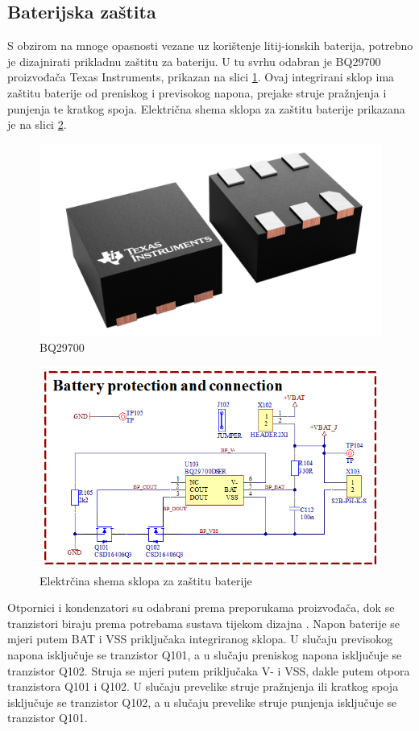 \subsection{Baterijska zaštita}
S obzirom na mnoge opasnosti vezane uz korištenje litij-ionskih baterija, potrebno je dizajnirati prikladnu zaštitu za bateriju. U tu svrhu odabran je BQ29700 proizvođača Texas Instruments, prikazan na slici \ref{slk:BQ29700}. Ovaj integrirani sklop ima zaštitu baterije od preniskog i previsokog napona, prejake struje pražnjenja i punjenja te kratkog spoja. Električna shema sklopa za zaštitu baterije prikazana je na slici \ref{slk:MB_BATPROT}.
\begin{figure}[hbt]
    \centering
    \includegraphics[width=6 cm]{Figures/BQ29700.png}
    \caption{BQ29700 \cite{tiweb:bq29700}}
    \label{slk:BQ29700}
\end{figure}
\begin{figure}[!hbt]
    \centering
    \includegraphics[width=10 cm]{Figures/MB_BATPROT.png}
    \caption{Elektrčina shema sklopa za zaštitu baterije}
    \label{slk:MB_BATPROT}
\end{figure}
Otpornici i kondenzatori su odabrani prema preporukama proizvođača, dok se tranzistori biraju prema potrebama sustava tijekom dizajna \cite{ti:bq29700}. Napon baterije se mjeri putem BAT i VSS priključaka integriranog sklopa. U slučaju previsokog napona isključuje se tranzistor Q101, a u slučaju preniskog napona isključuje se tranzistor Q102. Struja se mjeri putem priključaka V- i VSS, dakle putem otpora tranzistora Q101 i Q102. U slučaju prevelike struje pražnjenja ili kratkog spoja isključuje se tranzistor Q102, a u slučaju prevelike struje punjenja isključuje se tranzistor Q101.

